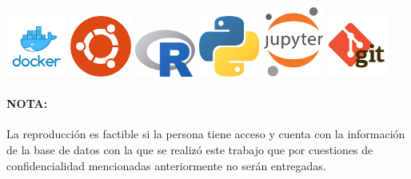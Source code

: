 \includegraphics[width=2cm]{imagenes/logos/docker.jpeg}
\includegraphics[width=2cm]{imagenes/logos/ubuntu_logo_2.png}
\includegraphics[width=2cm]{imagenes/logos/Rlogo.png}
\includegraphics[width=2cm]{imagenes/logos/python.jpeg}
\includegraphics[width=2cm]{imagenes/logos/jupyter.png}
\includegraphics[width=2cm]{imagenes/logos/git_logo_2.png}

\vspace{5mm}


\paragraph{NOTA:}
La reproducción es factible si la persona tiene acceso y cuenta con la información de la base de datos con la que se realizó este trabajo que por cuestiones de confidencialidad mencionadas anteriormente no serán entregadas.


